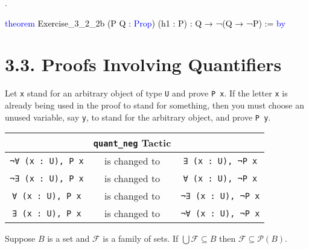 \documentclass[
  letterpaper,
  DIV=11,
  numbers=noendperiod]{scrreprt}
\makeatletter
\newenvironment{Shaded}{\begin{snugshade}}{\end{snugshade}}
\newcommand{\KeywordTok}[1]{\textcolor[rgb]{0.00,0.23,0.31}{#1}}
\newcommand{\NormalTok}[1]{\textcolor[rgb]{0.00,0.23,0.31}{#1}}
\newcommand{\SpecialCharTok}[1]{\textcolor[rgb]{0.37,0.37,0.37}{#1}}
\newcommand{\WarningTok}[1]{\textcolor[rgb]{0.37,0.37,0.37}{\textit{#1}}}
\def\redsquiggly{\bgroup \markoverwith{\textcolor{red}{\lower3.5\p@\hbox{\sixly \char58}}}\ULon}
\renewcommand{\NormalTok}[1]{\textcolor[HTML]{000000}{#1}}
\renewcommand{\KeywordTok}[1]{\textcolor[HTML]{0000FF}{#1}}
\renewcommand{\SpecialCharTok}[1]{}
\renewcommand{\WarningTok}[1]{\redsquiggly{\textcolor[HTML]{0000FF}{#1}}}
\newenvironment{ind}
	{\begin{list}{}{\setlength{\leftmargin}{1em}}\item\relax}
	{\end{list}}
\newcommand{\nobreakShaded}{\renewenvironment{Shaded}
	{\begin{tcolorbox}[frame hidden, enhanced, interior hidden, boxrule=0pt,
		borderline west={3pt}{0pt}{shadecolor}, sharp corners]}
	{\end{tcolorbox}}}
\newenvironment{numex}[1]
	{\begin{minipage}[t]{0.04\textwidth}\vspace{8pt}{#1}.
		\end{minipage}\nobreakShaded\begin{minipage}[t]{0.96\textwidth}\vspace{0pt}}
	{\end{minipage}}
\theoremstyle{remark}
\makeatother
\begin{document}
\begin{numex}{4}

\begin{Shaded}
\begin{Highlighting}[]
\KeywordTok{theorem}\NormalTok{ Exercise\_3\_2\_2b (P Q : }\KeywordTok{Prop}\NormalTok{)}
\NormalTok{    (h1 : P) : Q → ¬(Q → ¬P) := }\KeywordTok{by}
  
  \SpecialCharTok{**}\WarningTok{done}\SpecialCharTok{::}
\end{Highlighting}
\end{Shaded}

\end{numex}

\hypertarget{proofs-involving-quantifiers}{%
\section{3.3. Proofs Involving
Quantifiers}\label{proofs-involving-quantifiers}}

\begin{ind}
Let \texttt{x} stand for an arbitrary object of type \texttt{U} and
prove \texttt{P\ x}. If the letter \texttt{x} is already being used in
the proof to stand for something, then you must choose an unused
variable, say \texttt{y}, to stand for the arbitrary object, and prove
\texttt{P\ y}.

\end{ind}

\begin{longtable}[]{@{}ccc@{}}
\toprule\noalign{}
& \texttt{quant\_neg} Tactic & \\
\midrule\noalign{}
\endhead
\bottomrule\noalign{}
\endlastfoot
\texttt{¬∀\ (x\ :\ U),\ P\ x} & is changed to &
\texttt{∃\ (x\ :\ U),\ ¬P\ x} \\
\texttt{¬∃\ (x\ :\ U),\ P\ x} & is changed to &
\texttt{∀\ (x\ :\ U),\ ¬P\ x} \\
\texttt{∀\ (x\ :\ U),\ P\ x} & is changed to &
\texttt{¬∃\ (x\ :\ U),\ ¬P\ x} \\
\texttt{∃\ (x\ :\ U),\ P\ x} & is changed to &
\texttt{¬∀\ (x\ :\ U),\ ¬P\ x} \\
\end{longtable}

\begin{thm}
Suppose \(B\) is a set and \(\mathcal{F}\) is a family of sets. If
\(\bigcup\mathcal{F} \subseteq B\) then
\(\mathcal{F} \subseteq \mathscr{P}(B)\).

\end{thm}
\end{document}
